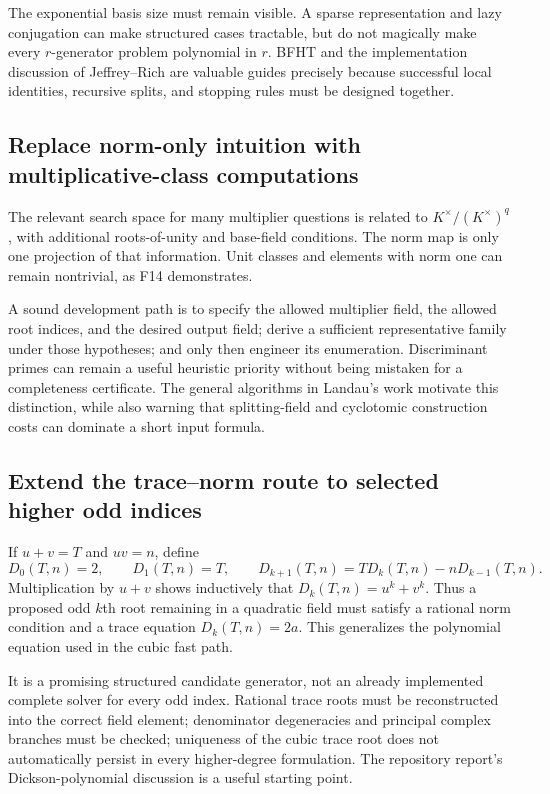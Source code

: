 \documentclass[11pt,letterpaper]{article}
\theoremstyle{definition}
\theoremstyle{remark}
\begin{document}
The exponential basis size must remain visible. A sparse representation and lazy conjugation can make structured cases tractable, but do not magically make every $r$-generator problem polynomial in $r$. BFHT and the implementation discussion of Jeffrey--Rich are valuable guides precisely because successful local identities, recursive splits, and stopping rules must be designed together.\cite{bfht,jeffrey}

\subsection{Replace norm-only intuition with multiplicative-class computations}

The relevant search space for many multiplier questions is related to $K^{\times}/(K^{\times})^q$, with additional roots-of-unity and base-field conditions. The norm map is only one projection of that information. Unit classes and elements with norm one can remain nontrivial, as F14 demonstrates.

A sound development path is to specify the allowed multiplier field, the allowed root indices, and the desired output field; derive a sufficient representative family under those hypotheses; and only then engineer its enumeration. Discriminant primes can remain a useful heuristic priority without being mistaken for a completeness certificate. The general algorithms in Landau's work motivate this distinction, while also warning that splitting-field and cyclotomic construction costs can dominate a short input formula.\cite{landau,report}

\subsection{Extend the trace--norm route to selected higher odd indices}

If $u+v=T$ and $uv=n$, define
\[
 D_0(T,n)=2,\qquad D_1(T,n)=T,\qquad
 D_{k+1}(T,n)=T D_k(T,n)-nD_{k-1}(T,n).
\]
Multiplication by $u+v$ shows inductively that $D_k(T,n)=u^k+v^k$. Thus a proposed odd $k$th root remaining in a quadratic field must satisfy a rational norm condition and a trace equation $D_k(T,n)=2a$. This generalizes the polynomial equation used in the cubic fast path.

It is a promising structured candidate generator, not an already implemented complete solver for every odd index. Rational trace roots must be reconstructed into the correct field element; denominator degeneracies and principal complex branches must be checked; uniqueness of the cubic trace root does not automatically persist in every higher-degree formulation. The repository report's Dickson-polynomial discussion is a useful starting point.\cite{report}
\end{document}
